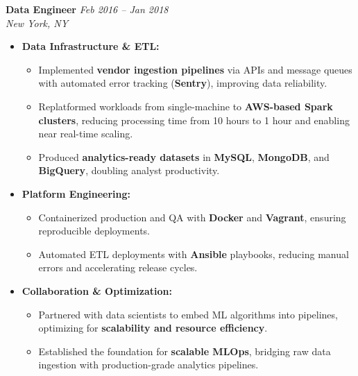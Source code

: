\vspace{0.15em}
\noindent\textbf{\sffamily Data Engineer} \hfill \textit{Feb 2016 -- Jan 2018} \\
 \hfill \textit{New York, NY}
\vspace{0.05em}

\begin{itemize}[leftmargin=1.25em, topsep=1pt, partopsep=1.5pt]
\setlength\itemsep{0.22em}

\item \textbf{Data Infrastructure \& ETL:}
    \begin{itemize}[leftmargin=2.25em]
        \setlength\itemsep{0.2em}
        \item Implemented \textbf{vendor ingestion pipelines} via APIs and message queues with automated error tracking (\textbf{Sentry}), improving data reliability.
        \item Replatformed workloads from single-machine to \textbf{AWS-based Spark clusters}, reducing processing time from 10 hours to 1 hour and enabling near real-time scaling.
        \item Produced \textbf{analytics-ready datasets} in \textbf{MySQL}, \textbf{MongoDB}, and \textbf{BigQuery}, doubling analyst productivity.
    \end{itemize}

\item \textbf{Platform Engineering:}
    \begin{itemize}[leftmargin=2.25em]
        \setlength\itemsep{0.2em}
        \item Containerized production and QA with \textbf{Docker} and \textbf{Vagrant}, ensuring reproducible deployments.
        \item Automated ETL deployments with \textbf{Ansible} playbooks, reducing manual errors and accelerating release cycles.
    \end{itemize}

\item \textbf{Collaboration \& Optimization:}
    \begin{itemize}[leftmargin=2.25em]
        \setlength\itemsep{0.2em}
        \item Partnered with data scientists to embed ML algorithms into pipelines, optimizing for \textbf{scalability and resource efficiency}.
        \item Established the foundation for \textbf{scalable MLOps}, bridging raw data ingestion with production-grade analytics pipelines.
    \end{itemize}

\end{itemize}
